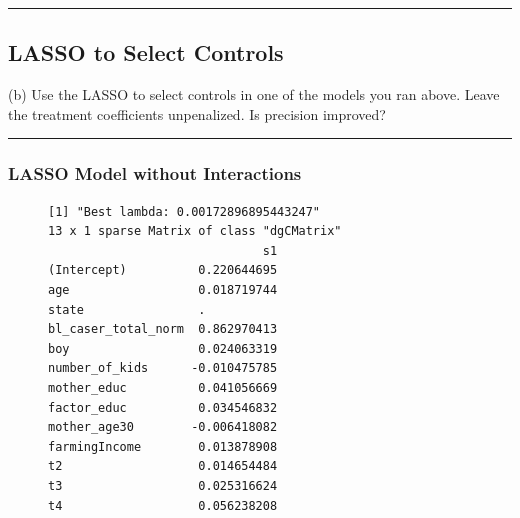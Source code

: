 \documentclass{article}
\newenvironment{colorparagraph}[1]{\par\color{#1}}{\par}
\begin{document}
\begin{colorparagraph}{questioncolor}
\label{q3b}
\rule{\textwidth}{0.5pt}
\subsection{LASSO to Select Controls}
(b) Use the LASSO to select controls in one of the models you ran above. Leave the treatment coefficients unpenalized. Is precision improved?

\rule{\textwidth}{0.5pt}
\end{colorparagraph}

\subsubsection*{LASSO Model without Interactions}
\begin{figure}[H]
\begin{lstlisting}[style=RstyleComment, caption=Regression with Demeaned Covariates and Interaction with Discrete Variables]
[1] "Best lambda: 0.00172896895443247"
13 x 1 sparse Matrix of class "dgCMatrix"
                              s1
(Intercept)          0.220644695
age                  0.018719744
state                .          
bl_caser_total_norm  0.862970413
boy                  0.024063319
number_of_kids      -0.010475785
mother_educ          0.041056669
factor_educ          0.034546832
mother_age30        -0.006418082
farmingIncome        0.013878908
t2                   0.014654484
t3                   0.025316624
t4                   0.056238208
\end{lstlisting}
\end{figure}
\end{document}
